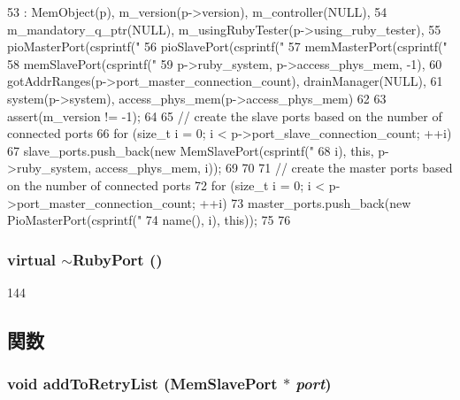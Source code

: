 \begin{DoxyCode}
53     : MemObject(p), m_version(p->version), m_controller(NULL),
54       m_mandatory_q_ptr(NULL), m_usingRubyTester(p->using_ruby_tester),
55       pioMasterPort(csprintf("%
56       pioSlavePort(csprintf("%
57       memMasterPort(csprintf("%
58       memSlavePort(csprintf("%
59           p->ruby_system, p->access_phys_mem, -1),
60       gotAddrRanges(p->port_master_connection_count), drainManager(NULL),
61       system(p->system), access_phys_mem(p->access_phys_mem)
62 {
63     assert(m_version != -1);
64 
65     // create the slave ports based on the number of connected ports
66     for (size_t i = 0; i < p->port_slave_connection_count; ++i) {
67         slave_ports.push_back(new MemSlavePort(csprintf("%
68             i), this, p->ruby_system, access_phys_mem, i));
69     }
70 
71     // create the master ports based on the number of connected ports
72     for (size_t i = 0; i < p->port_master_connection_count; ++i) {
73         master_ports.push_back(new PioMasterPort(csprintf("%
74             name(), i), this));
75     }
76 }
\end{DoxyCode}
\hypertarget{classRubyPort_ab94ca27fbdf091331d2703af1e73d8dc}{
\subsubsection[{$\sim$RubyPort}]{\setlength{\rightskip}{0pt plus 5cm}virtual $\sim${\bf RubyPort} ()}}
\label{classRubyPort_ab94ca27fbdf091331d2703af1e73d8dc}



\begin{DoxyCode}
144 {}
\end{DoxyCode}


\subsection{関数}
\hypertarget{classRubyPort_ad473637152492944180673282ebe71a3}{
\subsubsection[{addToRetryList}]{\setlength{\rightskip}{0pt plus 5cm}void addToRetryList ({\bf MemSlavePort} $\ast$ {\em port})}}
\label{classRubyPort_ad473637152492944180673282ebe71a3}



